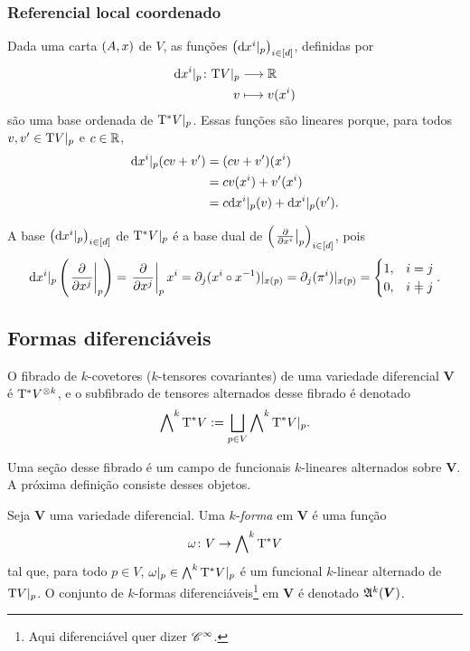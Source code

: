 \subsubsection{Referencial local coordenado}

Dada uma carta $(A,x)$ de $V$, as funções $\left( \mathrm{d} x^i|_p \right)_{i \in [d]}$, definidas por
	\begin{align*}
	{\mathrm{d}x^i|_p}\colon {\mathrm{T}V|_p} &\longrightarrow {\mathbb{R}} \\{v} &\longmapsto v(x^i)
	\end{align*}
são uma base ordenada de $\mathrm{T}^* V|_p$. Essas funções são lineares porque, para todos $v,v' \in \mathrm{T} V|_p$ e $c \in \mathbb{R}$,
	\begin{align*}
	\mathrm{d} x^i|_p(cv+v') &= (cv+v')(x^i) \\
		&= cv(x^i) + v'(x^i) \\
		&= c\mathrm{d} x^i|_p(v) + \mathrm{d} x^i|_p(v').
	\end{align*}

A base $\left( \mathrm{d} x^i|_p \right)_{i \in [d]}$ de $\mathrm{T}^* V|_p$ é a base dual de $\left( \left.{\frac{\partial{}}{\partial{x^i}}}\right|_{p} \right)_{i \in [d]}$, pois
	\begin{equation*}
	\dd x^i|_p\left(\derr{\x^j}_{p}\right) = \derr{\x^j}_{p}\x^i = \partial_j(\x^i \circ \x\inv)|_{\x(p)} = \partial_j(\pi^i)|_{\x(p)} = 
		\begin{cases}
			1,& i=j \\
			0,& i \neq j
		\end{cases}.
	\end{equation*}





\subsection{Formas diferenciáveis}

O fibrado de $k$-covetores ($k$-tensores covariantes) de uma variedade diferencial $\bm V$ é $\mathrm{T}^* V^{\otimes k}$, e o subfibrado de tensores alternados desse fibrado é denotado
	\begin{equation*}
	\bigwedge\nolimits^k \mathrm{T}^* V := \bigsqcup_{p \in V} \bigwedge\nolimits^k \mathrm{T}^* V|_p.
	\end{equation*}

Uma seção desse fibrado é um campo de funcionais $k$-lineares alternados sobre $\bm V$. A próxima definição consiste desses objetos.

\begin{definition}
Seja $\bm V$ uma variedade diferencial. Uma $k$-\emph{forma} em $\bm V$ é uma função
	\begin{equation*}
	\omega\colon V \to \bigwedge\nolimits^k \mathrm{T}^* V
	\end{equation*}
tal que, para todo $p \in V$, $\omega|_p \in \bigwedge^k\mathrm{T}^* V|_p$ é um funcional $k$-linear alternado de $\mathrm{T} V|_p$. O conjunto de $k$-formas diferenciáveis\footnote{Aqui diferenciável quer dizer $\mathscr{C}^\infty$.} em $\bm V$ é denotado $\mathfrak{A}^k (\bm V)$.
\end{definition}

